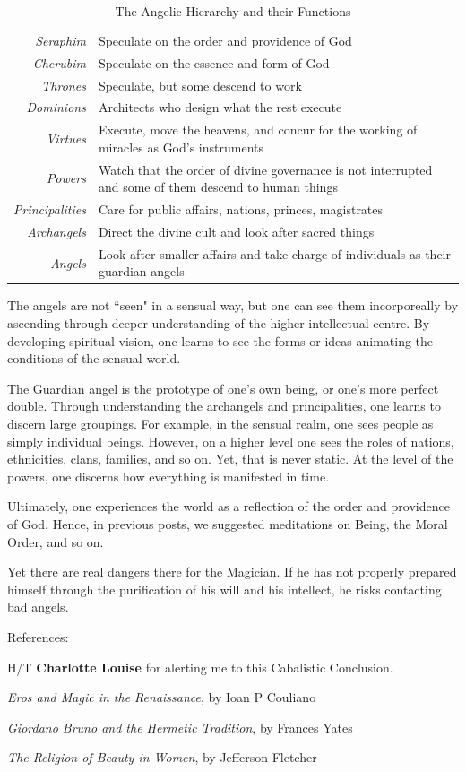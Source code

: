 \begin{table}[h]\small
\begin{tabularx}{\textwidth}{>{\itshape}rX}
\toprule
Seraphim &
Speculate on the order and providence of God\\
Cherubim &
Speculate on the essence and form of God\\
Thrones &
Speculate, but some descend to work\\
Dominions &
Architects who design what the rest execute\\
Virtues &
Execute, move the heavens, and concur for the working of miracles as God's instruments\\
Powers &
Watch that the order of divine governance is not interrupted and some of them descend to human things\\
Principalities &
Care for public affairs, nations, princes, magistrates\\
Archangels &
Direct the divine cult and look after sacred things\\
Angels &
Look after smaller affairs and take charge of individuals as their guardian angels\\\bottomrule
\end{tabularx}
\caption{The Angelic Hierarchy and their Functions}
\label{tab:AngelicHierarchy}
\end{table}
The angels are not ``seen" in a sensual way, but one can see them incorporeally by ascending through deeper understanding of the higher intellectual centre. By developing spiritual vision, one learns to see the forms or ideas animating the conditions of the sensual world.

The Guardian angel is the prototype of one's own being, or one's more perfect double. Through understanding the archangels and principalities, one learns to discern large groupings. For example, in the sensual realm, one sees people as simply individual beings. However, on a higher level one sees the roles of nations, ethnicities, clans, families, and so on. Yet, that is never static. At the level of the powers, one discerns how everything is manifested in time.

Ultimately, one experiences the world as a reflection of the order and providence of God. Hence, in previous posts, we suggested meditations on Being, the Moral Order, and so on.

Yet there are real dangers there for the Magician. If he has not properly prepared himself through the purification of his will and his intellect, he risks contacting bad angels.


\hfill



References:

H/T \textbf{Charlotte Louise} for alerting me to this Cabalistic Conclusion.

\emph{Eros and Magic in the Renaissance}, by Ioan P Couliano

\emph{Giordano Bruno and the Hermetic Tradition}, by Frances Yates

\emph{The Religion of Beauty in Women}, by Jefferson Fletcher



